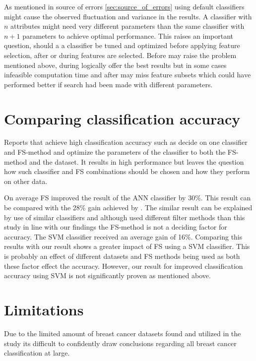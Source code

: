 As mentioned in source of errors \ref{sec:source_of_errors} using default classifiers might cause the observed fluctuation and variance in the results. A classifier with $n$ attributes might need very different parameters than the same classifier with $n + 1$ parameters to achieve optimal performance. This raises an important question, should a a classifier be tuned and optimized before applying feature selection, after or during features are selected. Before may raise the problem mentioned above, during logically offer the best results but in some cases infeasible computation time and after may miss feature subsets which could have performed better if search had been made with different parameters.

\section{Comparing classification accuracy}

Reports that achieve high classification accuracy such as \textcite{akay2009} decide on one classifier and FS-method and optimize the parameters of the classifier to both the FS-method and the dataset. It results in high performance but leaves the question how such classifier and FS combinations should be chosen and how they perform on other data.

On average FS improved the result of the ANN classifier by 30\%. This result can be compared with the 28\% gain achieved by \textcite{karabulut2012}. The similar result can be explained by use of similar classifiers and although \textcite{karabulut2012} used different filter methods than this study in line with our findings the FS-method is not a deciding factor for accuracy. The SVM classifier received an average gain of 16\%. Comparing this results with \textcite{b20103177} our result shows a greater impact of FS using a SVM classifier. This is probably an effect of different datasets and FS methods being used as both these factor effect the accuracy. However, our result for improved classification accuracy using SVM is not significantly proven as mentioned above.

\section{Limitations}

Due to the limited amount of breast cancer datasets found and utilized in the study its difficult to confidently draw conclusions regarding all breast cancer classification at large.

